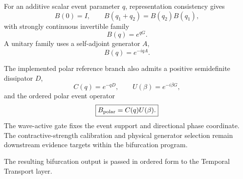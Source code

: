 For an additive scalar event parameter $q$, representation consistency gives
\[
B(0)=I,
\qquad
B(q_1+q_2)=B(q_2)B(q_1),
\]
with strongly continuous invertible family
\[
B(q)=e^{qG}.
\]
A unitary family uses a self-adjoint generator $A$,
\[
B(q)=e^{-iqA}.
\]

The implemented polar reference branch also admits a positive semidefinite dissipator $D$,
\[
C(q)=e^{-qD},
\qquad
U(\beta)=e^{-i\beta G},
\]
and the ordered polar event operator
\[
\boxed{
B_{\rm polar}=C(q)U(\beta).
}
\]
The wave-active gate fixes the event support and directional phase coordinate.  The contractive-strength calibration and physical generator selection remain downstream evidence targets within the bifurcation program.

The resulting bifurcation output is passed in ordered form to the Temporal Transport layer.
